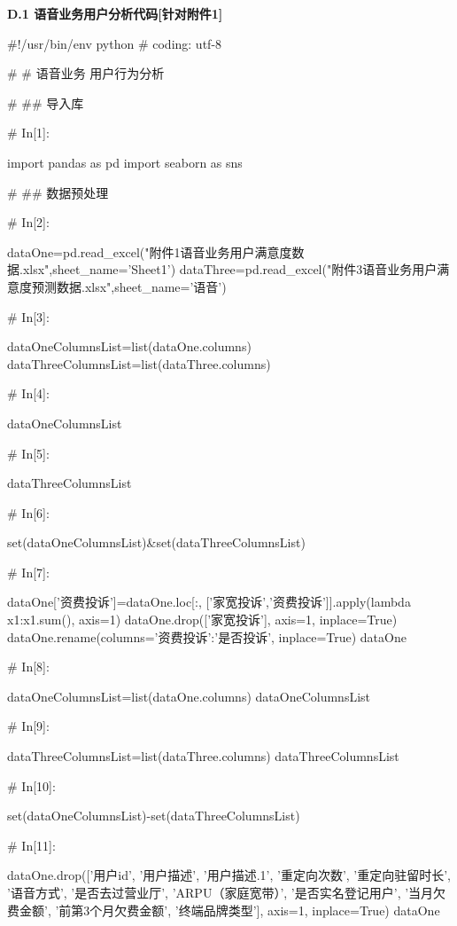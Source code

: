 \documentclass{MathorCupmodeling}
\begin{document}
\newpage

\textbf{D.1 语音业务用户分析代码[针对附件1]}
\begin{python}
#!/usr/bin/env python
# coding: utf-8

# # 语音业务 用户行为分析

# ## 导入库

# In[1]:


import pandas as pd
import seaborn as sns


# ## 数据预处理

# In[2]:


dataOne=pd.read_excel("附件1语音业务用户满意度数据.xlsx",sheet_name='Sheet1')
dataThree=pd.read_excel("附件3语音业务用户满意度预测数据.xlsx",sheet_name='语音')


# In[3]:


dataOneColumnsList=list(dataOne.columns)
dataThreeColumnsList=list(dataThree.columns)


# In[4]:


dataOneColumnsList


# In[5]:


dataThreeColumnsList


# In[6]:


set(dataOneColumnsList)&set(dataThreeColumnsList)


# In[7]:


dataOne['资费投诉']=dataOne.loc[:, ['家宽投诉','资费投诉']].apply(lambda x1:x1.sum(), axis=1)
dataOne.drop(['家宽投诉'], axis=1, inplace=True)
dataOne.rename(columns={'资费投诉':'是否投诉'}, inplace=True)
dataOne


# In[8]:


dataOneColumnsList=list(dataOne.columns)
dataOneColumnsList


# In[9]:


dataThreeColumnsList=list(dataThree.columns)
dataThreeColumnsList


# In[10]:


set(dataOneColumnsList)-set(dataThreeColumnsList)


# In[11]:


dataOne.drop(['用户id',
              '用户描述',
              '用户描述.1',
              '重定向次数',
              '重定向驻留时长',
              '语音方式',
              '是否去过营业厅',
              'ARPU（家庭宽带）',
              '是否实名登记用户',
              '当月欠费金额',
              '前第3个月欠费金额',
              '终端品牌类型'], axis=1, inplace=True)
dataOne



\end{python}
\end{document}
